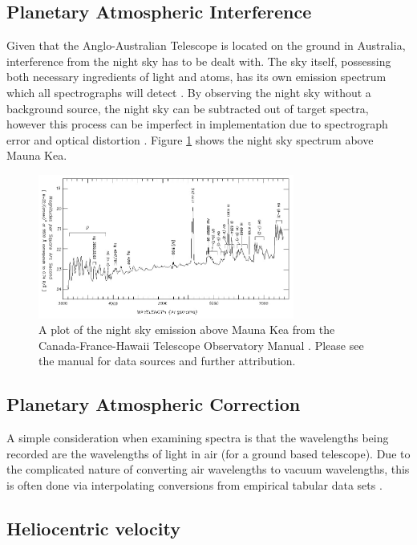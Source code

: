 \documentclass[titlesmallcaps, examinerscopy, copyrightpage]{uqthesis}
\begin{document}
\subsection{Planetary Atmospheric Interference}

Given that the Anglo-Australian Telescope is located on the ground in Australia, interference from the night sky has to be dealt with. The sky itself, possessing both necessary ingredients of light and atoms, has its own emission spectrum which all spectrographs will detect \cite{Meinel1950Emission}. By observing the night sky without a background source, the night sky can be subtracted out of target spectra, however this process can be imperfect in implementation due to spectrograph error and optical distortion \cite{Kelson2003Optimal}. Figure \ref{fig:night} shows the night sky spectrum above Mauna Kea.

\begin{figure}[ht!]
\includegraphics[width=0.75\textwidth]{images/om-nskyvis.jpg} 
\centering
\caption{A plot of the night sky emission above Mauna Kea from the Canada-France-Hawaii Telescope Observatory Manual \cite{night}. Please see the manual for data sources and further attribution.}
\label{fig:night}
\end{figure}

\subsection{Planetary Atmospheric Correction}

A simple consideration when examining spectra is that the wavelengths being recorded are the wavelengths of light in air (for a ground based telescope). Due to the complicated nature of converting air wavelengths to vacuum wavelengths, this is often done via interpolating conversions from empirical tabular data sets \cite{morton1991atomic}.

\subsection{Heliocentric velocity}
\end{document}
